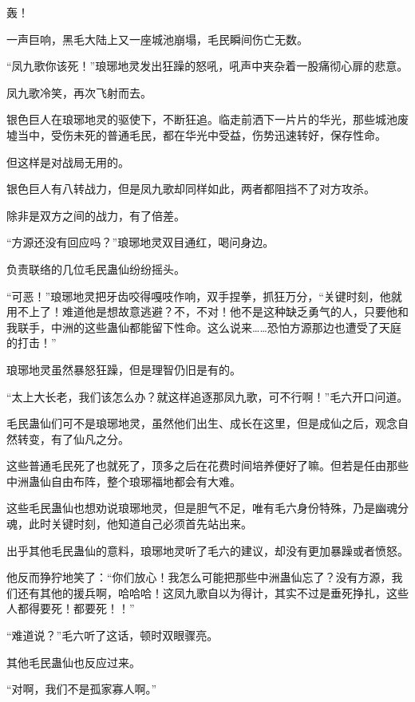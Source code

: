 
\begin{this_body}

轰！

一声巨响，黑毛大陆上又一座城池崩塌，毛民瞬间伤亡无数。

“凤九歌你该死！”琅琊地灵发出狂躁的怒吼，吼声中夹杂着一股痛彻心扉的悲意。

凤九歌冷笑，再次飞射而去。

银色巨人在琅琊地灵的驱使下，不断狂追。临走前洒下一片片的华光，那些城池废墟当中，受伤未死的普通毛民，都在华光中受益，伤势迅速转好，保存性命。

但这样是对战局无用的。

银色巨人有八转战力，但是凤九歌却同样如此，两者都阻挡不了对方攻杀。

除非是双方之间的战力，有了倍差。

“方源还没有回应吗？”琅琊地灵双目通红，喝问身边。

负责联络的几位毛民蛊仙纷纷摇头。

“可恶！”琅琊地灵把牙齿咬得嘎吱作响，双手捏拳，抓狂万分，“关键时刻，他就用不上了！难道他是想故意逃避？不，不对！他不是这种缺乏勇气的人，只要他和我联手，中洲的这些蛊仙都能留下性命。这么说来……恐怕方源那边也遭受了天庭的打击！”

琅琊地灵虽然暴怒狂躁，但是理智仍旧是有的。

“太上大长老，我们该怎么办？就这样追逐那凤九歌，可不行啊！”毛六开口问道。

毛民蛊仙们可不是琅琊地灵，虽然他们出生、成长在这里，但是成仙之后，观念自然转变，有了仙凡之分。

这些普通毛民死了也就死了，顶多之后在花费时间培养便好了嘛。但若是任由那些中洲蛊仙自由布阵，整个琅琊福地都会有大难。

这些毛民蛊仙也想劝说琅琊地灵，但是胆气不足，唯有毛六身份特殊，乃是幽魂分魂，此时关键时刻，他知道自己必须首先站出来。

出乎其他毛民蛊仙的意料，琅琊地灵听了毛六的建议，却没有更加暴躁或者愤怒。

他反而狰狞地笑了：“你们放心！我怎么可能把那些中洲蛊仙忘了？没有方源，我们还有其他的援兵啊，哈哈哈！这凤九歌自以为得计，其实不过是垂死挣扎，这些人都得要死！都要死！！”

“难道说？”毛六听了这话，顿时双眼骤亮。

其他毛民蛊仙也反应过来。

“对啊，我们不是孤家寡人啊。”


\end{this_body}
